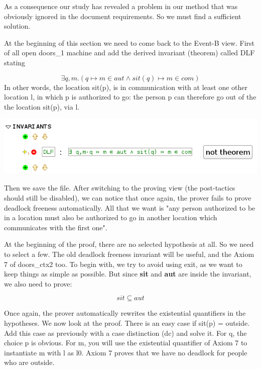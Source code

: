 As a consequence our study has revealed a problem in our method that was obviously ignored in the document requirements.
So we must find a sufficient solution.
\[

\]

At the beginning of this section we need to come back to the \textsf{Event-B view}.
First of all open doors\_1 machine and add the derived invariant (theorem) called DLF stating 

\[
\exists q,m.(q \mapsto m \in aut \land sit(q) \mapsto m \in com )
\]
In other words, the location sit(p), is in communication with at least one other location l, in which p is authorized to go:
the person p can therefore go out of the the location sit(p), via l.

\begin{center}
	\includegraphics[]{img/tutorial/tut_10_invariants2.png}
\end{center}

Then we save the file. After switching to the proving view (the post-tactics should still be disabled), we can notice that once again, the prover fails to prove deadlock freeness automatically. 
All that we want is "any person authorized to be in a location must also be authorized to go in another location which communicates with the first one".

\[
\]
At the beginning of the proof, there are no selected hypothesis at all. So we need to select a few. The old deadlock freeness invariant will be useful, and the Axiom 7 of doors\_ctx2 too. To begin with, we try to avoid using exit, as we want to keep things as simple as possible. But since \textbf{sit} and \textbf{aut} are inside the invariant, we also need to prove:

\[
sit \subseteq aut
\]

Once again, the prover automatically rewrites the existential quantifiers in the hypotheses. We now look at the proof. There is an easy case if sit(p) = outside. Add this case as previously with a case distinction (dc) and solve it. For q, the choice p is obvious. For m, you will use the existential quantifier of Axiom 7 to instantiate m with l as l0. 
Axiom 7 proves that we have no deadlock for people who are outside.

